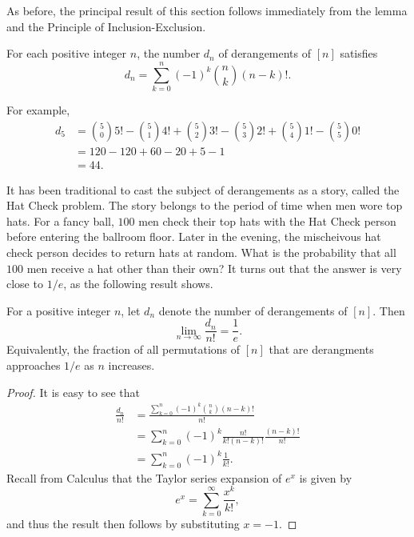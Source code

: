 As before, the principal result of this section follows immediately
from the lemma and the Principle of Inclusion-Exclusion.

\begin{theorem}
For each positive integer $n$, the number $d_n$ of derangements of $[n]$
satisfies
\[
d_n=\sum_{k=0}^n (-1)^k\binom{n}{k}(n-k)!.
\]

\end{theorem}

For example,
\begin{align*}
d_5 & =\binom{5}{0}5!-\binom{5}{1}4!+\binom{5}{2}3!-\binom{5}{3}2!+
   \binom{5}{4}1!-\binom{5}{5}0!\\
    &=120-120+60-20+5-1\\
    &=44.
\end{align*}

It has been traditional to cast the subject of derangements as a
story, called the Hat Check problem. The story belongs to the period
of time when men wore top hats. For a fancy ball, $100$ men check
their top hats with the Hat Check person before entering the ballroom
floor. Later in the evening, the mischeivous hat check person decides
to return hats at random. What is the probability that all $100$ men
receive a hat other than their own? It turns out that the answer is
very close to $1/e$, as the following result shows.

\begin{theorem}
  For a positive integer $n$, let $d_n$ denote the number of
  derangements of $[n]$. Then
  \[
  \lim_{n\rightarrow\infty}\frac{d_n}{n!} = \frac{1}{e}.
  \] 
  Equivalently, the fraction of all permutations of $[n]$ that are
  derangments approaches $1/e$ as $n$ increases.
\end{theorem}

\begin{proof}
It is easy to see that
\begin{align*}
\frac{d_n}{n!} &= \frac{\sum_{k=0}^n (-1)^k\binom{n}{k}(n-k)!}{n!}\\
               &= \sum_{k=0}^n (-1)^k \frac{n!}{k!(n-k)!}\frac{(n-k)!}{n!}\\
               &= \sum_{k=0}^n (-1)^k \frac{1}{k!}.
\end{align*}
Recall from Calculus that the Taylor series expansion of $e^x$ is given
by 
\[
e^x = \sum_{k=0}^{\infty} \frac{x^k}{k!},
\]
and thus the result then follows by substituting $x=-1$.
\end{proof}

